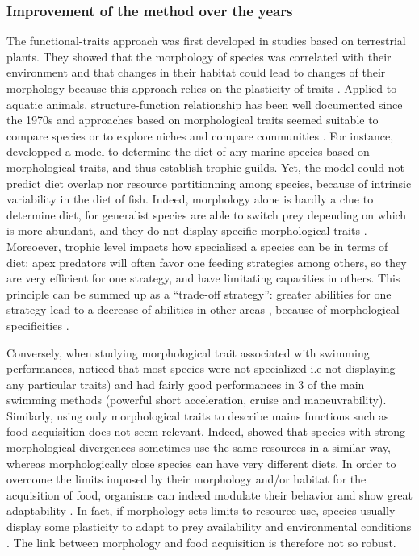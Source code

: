 \subsubsection{Improvement of the method over the years}
The functional-traits approach was first developed in studies based on terrestrial plants. They showed that the morphology of species was correlated with their environment and that changes in their habitat could lead to changes of their morphology because this approach relies on the plasticity of traits \citep{boissezon2014,lavorel1997,martini2020}. Applied to aquatic animals, structure-function relationship has been well documented since the 1970s \citep{gosline1971, lagler1977, webb1984} and approaches based on morphological traits  seemed suitable to compare species \citep{norton1995} or to explore niches and compare communities \citep{winemiller1991}. For instance, \citet{albouy2011} developped a model to determine the diet of any marine species based on morphological traits, and thus establish trophic guilds. Yet, the model could not predict diet overlap nor resource partitionning among species, because of intrinsic variability in the diet of fish. Indeed, morphology alone is hardly a clue to determine diet, for generalist species are able to switch prey depending on which  is more abundant, and they do not display specific morphological traits \citep{sibbing2000}. Moreoever, trophic level impacts how specialised a species can be in terms of diet: apex predators will often favor one feeding strategies among others, so they are very efficient for one strategy, and have limitating capacities in others. This principle can be summed up as a ``trade-off strategy'': greater abilities for one strategy lead to a decrease of abilities in other areas \citet{norton1995}, because of morphological specificities \citep{nagelkerke2018}.

Conversely, when studying morphological trait associated with swimming performances, \citet{webb1984} noticed that most species were not specialized i.e not displaying any particular traits) and had fairly good performances in 3 of the main swimming methods (powerful short acceleration, cruise and maneuvrability). Similarly, using only morphological traits to describe mains functions such as food acquisition does not seem relevant. Indeed, \citet{grossman2009} showed that species with strong morphological divergences sometimes use the same resources in a similar way, whereas morphologically close species can have very different diets. In order to overcome the limits imposed by their morphology and/or habitat for the acquisition of food, organisms can indeed modulate their behavior and show great adaptability \citep{blondel1979,grossman2009}. In fact, if morphology sets limits to resource use, species usually display some plasticity to adapt to prey availability and environmental conditions \citep{ibanez2007,sibbing2000}. The link between morphology and food acquisition is therefore not so robust.

